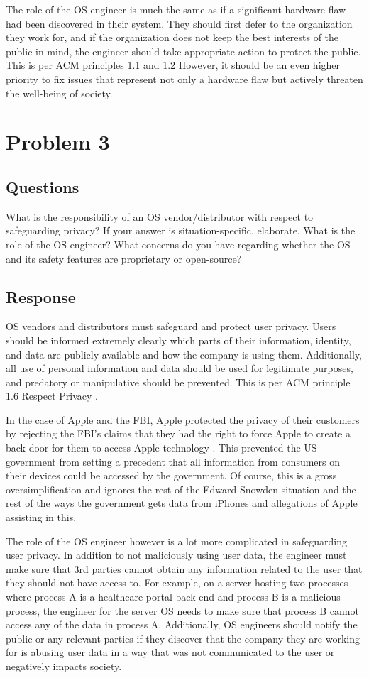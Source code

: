 \documentclass{assignment-x}
\begin{document}
The role of the OS engineer is much the same as if a significant hardware flaw had been discovered in their system. They should first defer to the organization they work for, and if the organization does not keep the best interests of the public in mind, the engineer should take appropriate action to protect the public. This is per ACM principles 1.1 and 1.2 \cite{ACMCodeOfEthics} However, it should be an even higher priority to fix issues that represent not only a hardware flaw but actively threaten the well-being of society.

\section{Problem 3}
\subsection{Questions}
What is the responsibility of an OS vendor/distributor with respect to safeguarding privacy? If your answer is situation-specific, elaborate.
What is the role of the OS engineer? 
What concerns do you have regarding whether the OS and its safety features are proprietary or open-source?
\subsection{Response}
OS vendors and distributors must safeguard and protect user privacy. Users should be informed extremely clearly which parts of their information, identity, and data are publicly available and how the company is using them. Additionally, all use of personal information and data should be used for legitimate purposes, and predatory or manipulative should be prevented. This is per ACM principle 1.6 Respect Privacy \cite{ACMCodeOfEthics}. 

In the case of Apple and the FBI, Apple protected the privacy of their customers by rejecting the FBI's claims that they had the right to force Apple to create a back door for them to access Apple technology \cite{apple_fbi_encryption_dispute_wikipedia}. This prevented the US government from setting a precedent that all information from consumers on their devices could be accessed by the government. Of course, this is a gross oversimplification and ignores the rest of the Edward Snowden \cite{snowden_guardian} situation and the rest of the ways the government gets data from iPhones and allegations of Apple assisting in this. 

The role of the OS engineer however is a lot more complicated in safeguarding user privacy. In addition to not maliciously using user data, the engineer must make sure that 3rd parties cannot obtain any information related to the user that they should not have access to. For example, on a server hosting two processes where process A is a healthcare portal back end and process B is a malicious process, the engineer for the server OS needs to make sure that process B cannot access any of the data in process A. Additionally, OS engineers should notify the public or any relevant parties if they discover that the company they are working for is abusing user data in a way that was not communicated to the user or negatively impacts society.
\end{document}
